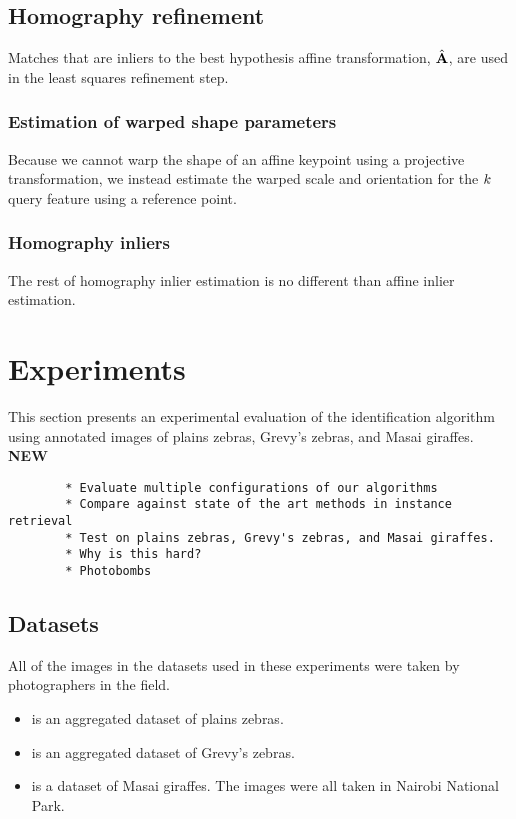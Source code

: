     \subsection{Homography refinement}
        Matches that are inliers to the best hypothesis affine transformation, $\hat{\mathbf{A}}$, are used in the least
          squares refinement step.
        
        \subsubsection{Estimation of warped shape parameters}
            Because we cannot warp the shape of an affine keypoint using a projective transformation, we instead
              estimate the warped scale and orientation for the $k$\th{} query feature using a reference point.
            
        \subsubsection{Homography inliers}
            The rest of homography inlier estimation is no different than affine inlier estimation.

\section{Experiments}
    This section presents an experimental evaluation of the identification algorithm using annotated images of plains
      zebras, Grevy's zebras, and Masai giraffes.
    {\large{\textbf{NEW}}}

    \begin{verbatim}
        * Evaluate multiple configurations of our algorithms
        * Compare against state of the art methods in instance retrieval
        * Test on plains zebras, Grevy's zebras, and Masai giraffes.
        * Why is this hard?
        * Photobombs
    \end{verbatim}

    \subsection{Datasets}
        All of the images in the datasets used in these experiments were taken by photographers in the field.
        
        \begin{itemize}
            \item \textbf{\pzmasterI{}} is an aggregated dataset of
                plains zebras.
                
            \item \textbf{\gzall{}} is an aggregated dataset of Grevy's
                zebras.
                
            \item \textbf{\girmmasterI{}} is a dataset of Masai giraffes.
                The images were all taken in Nairobi National Park.
        \end{itemize}

